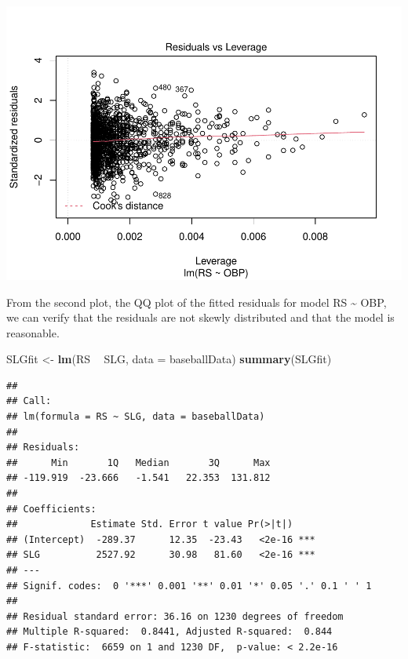 \documentclass[
]{article}
\newenvironment{Shaded}{\begin{snugshade}}{\end{snugshade}}
\newcommand{\DataTypeTok}[1]{\textcolor[rgb]{0.13,0.29,0.53}{#1}}
\newcommand{\KeywordTok}[1]{\textcolor[rgb]{0.13,0.29,0.53}{\textbf{#1}}}
\newcommand{\NormalTok}[1]{#1}
\newcommand{\OperatorTok}[1]{\textcolor[rgb]{0.81,0.36,0.00}{\textbf{#1}}}
\newcommand{\StringTok}[1]{\textcolor[rgb]{0.31,0.60,0.02}{#1}}
\begin{document}
\includegraphics{HW2_Liu-Zi-Jian_files/figure-latex/unnamed-chunk-36-4.pdf}

From the second plot, the QQ plot of the fitted residuals for model RS
\textasciitilde{} OBP, we can verify that the residuals are not skewly
distributed and that the model is reasonable.

\begin{Shaded}
\begin{Highlighting}[]
\NormalTok{SLGfit <-}\StringTok{ }\KeywordTok{lm}\NormalTok{(RS }\OperatorTok{~}\StringTok{ }\NormalTok{SLG, }\DataTypeTok{data =}\NormalTok{ baseballData)}
\KeywordTok{summary}\NormalTok{(SLGfit)}
\end{Highlighting}
\end{Shaded}

\begin{verbatim}
## 
## Call:
## lm(formula = RS ~ SLG, data = baseballData)
## 
## Residuals:
##      Min       1Q   Median       3Q      Max 
## -119.919  -23.666   -1.541   22.353  131.812 
## 
## Coefficients:
##             Estimate Std. Error t value Pr(>|t|)    
## (Intercept)  -289.37      12.35  -23.43   <2e-16 ***
## SLG          2527.92      30.98   81.60   <2e-16 ***
## ---
## Signif. codes:  0 '***' 0.001 '**' 0.01 '*' 0.05 '.' 0.1 ' ' 1
## 
## Residual standard error: 36.16 on 1230 degrees of freedom
## Multiple R-squared:  0.8441, Adjusted R-squared:  0.844 
## F-statistic:  6659 on 1 and 1230 DF,  p-value: < 2.2e-16
\end{verbatim}

\begin{Shaded}
\end{Shaded}
\end{document}
